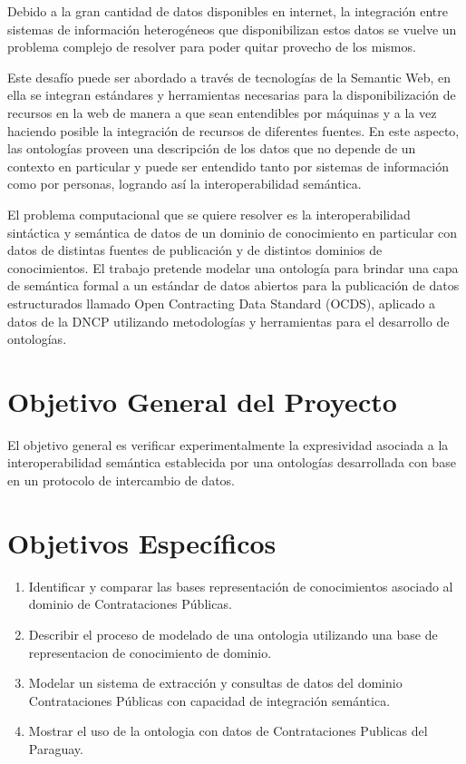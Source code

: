 Debido a la gran cantidad de datos disponibles en internet, la integración entre sistemas de información heterogéneos que disponibilizan estos datos se vuelve un problema complejo de resolver para poder quitar provecho de los mismos. 

Este desafío puede ser abordado a través de tecnologías de la Semantic Web, en ella se integran estándares y herramientas necesarias para la disponibilización de recursos en la web de manera a que sean entendibles por máquinas y a la vez haciendo posible la integración de recursos de diferentes fuentes. En este aspecto, las ontologías proveen una descripción de los datos que no depende de un contexto en particular y puede ser entendido tanto por sistemas de información como por personas, logrando así la interoperabilidad semántica.

El problema computacional que se quiere resolver es la interoperabilidad sintáctica y semántica de datos de un dominio de conocimiento en particular con datos de distintas fuentes de publicación y de distintos dominios de conocimientos. El trabajo pretende modelar una ontología para brindar una capa de semántica formal a un estándar de datos abiertos para la publicación de datos estructurados llamado Open Contracting Data Standard (OCDS), aplicado a datos de la DNCP utilizando metodologías y herramientas para el desarrollo de ontologías. 


\section{Objetivo General del Proyecto}

El objetivo general es verificar experimentalmente la expresividad asociada a la interoperabilidad semántica establecida por una ontologías desarrollada con base en un protocolo de intercambio de datos.


\section{Objetivos Específicos}
\label{objetivos especiicos}

\begin{enumerate}
    \item \label{obj:1}  Identificar y comparar las bases representación de conocimientos asociado al dominio de Contrataciones Públicas.
    \item \label{obj:2}  Describir el proceso de modelado de una ontologia utilizando una base de representacion de conocimiento de dominio.
    \item \label{obj:3}  Modelar un sistema de extracción y consultas de datos del dominio Contrataciones Públicas con capacidad de integración semántica.
    \item \label{obj:4}  Mostrar el uso de la ontologia con datos de Contrataciones Publicas del Paraguay.
\end{enumerate}


